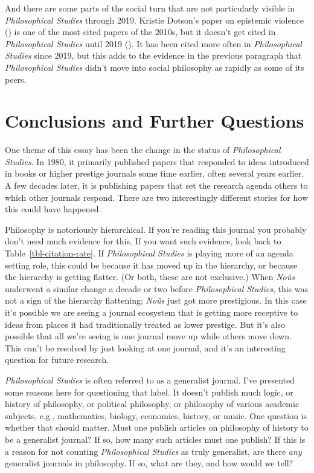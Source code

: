 \documentclass[
  10pt,
  letterpaper,
  DIV=11,
  numbers=noendperiod,
  twoside]{scrartcl}
\begin{document}
And there are some parts of the social turn that are not particularly
visible in \emph{Philosophical Studies} through 2019. Kristie Dotson's
paper on epistemic violence () is one of the most cited papers of the 2010s, but it doesn't get
cited in \emph{Philosophical Studies} until 2019
(). It has been cited
more often in \emph{Philosophical Studies} since 2019, but this adds to
the evidence in the previous paragraph that \emph{Philosophical Studies}
didn't move into social philosophy as rapidly as some of its peers.

\section{Conclusions and Further
Questions}\label{conclusions-and-further-questions}

One theme of this essay has been the change in the status of
\emph{Philosophical Studies}. In 1980, it primarily published papers
that responded to ideas introduced in books or higher prestige journals
some time earlier, often several years earlier. A few decades later, it
is publishing papers that set the research agenda others to which other
journals respond. There are two interestingly different stories for how
this could have happened.

Philosophy is notoriously hierarchical. If you're reading this journal
you probably don't need much evidence for this. If you want such
evidence, look back to Table~\ref{tbl-citation-rate}. If
\emph{Philosophical Studies} is playing more of an agenda setting role,
this could be because it has moved up in the hierarchy, or because the
hierarchy is getting flatter. (Or both, these are not exclusive.) When
\emph{Noûs} underwent a similar change a decade or two before
\emph{Philosophical Studies}, this was not a sign of the hierarchy
flattening; \emph{Noûs} just got more prestigious. In this case it's
possible we are seeing a journal ecosystem that is getting more
receptive to ideas from places it had traditionally treated as lower
prestige. But it's also possible that all we're seeing is one journal
move up while others move down. This can't be resolved by just looking
at one journal, and it's an interesting question for future research.

\emph{Philosophical Studies} is often referred to as a generalist
journal. I've presented some reasons here for questioning that label. It
doesn't publish much logic, or history of philosophy, or political
philosophy, or philosophy of various academic subjects, e.g.,
mathematics, biology, economics, history, or music. One question is
whether that should matter. Must one publish articles on philosophy of
history to be a generalist journal? If so, how many such articles must
one publish? If this is a reason for not counting \emph{Philosophical
Studies} as truly generalist, are there \emph{any} generalist journals
in philosophy. If so, what are they, and how would we tell?
\end{document}
